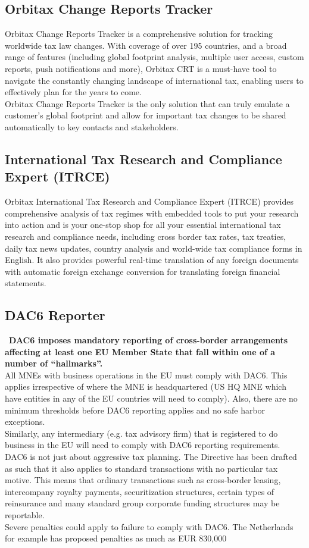 \begin{flushleft}
\subsection{Orbitax Change Reports Tracker}
Orbitax Change Reports Tracker is a comprehensive solution for tracking worldwide tax law changes. With coverage of over 195 countries, and a broad range of features (including global footprint analysis, multiple user access, custom reports, push notifications and more), Orbitax CRT is a must-have tool to navigate the constantly changing landscape of international tax, enabling users to effectively plan for the years to come.\\

Orbitax Change Reports Tracker is the only solution that can truly emulate a customer’s global footprint and allow for important tax changes to be shared automatically to key contacts and stakeholders.

\subsection{International Tax Research and Compliance Expert (ITRCE)}
Orbitax International Tax Research and Compliance Expert (ITRCE) provides comprehensive analysis of tax regimes with embedded tools to put your research into action and is your one-stop shop for all your essential international tax research and compliance needs, including cross border tax rates, tax treaties, daily tax news updates, country analysis and world-wide tax compliance forms in English. It also provides powerful real-time translation of any foreign documents with automatic foreign exchange conversion for translating foreign financial statements.

\subsection{DAC6 Reporter}\
\textbf{DAC6 imposes mandatory reporting of cross-border arrangements affecting at least one EU Member State that fall within one of a number of “hallmarks”.}\\
All MNEs with business operations in the EU must comply with DAC6. This applies irrespective of where the MNE is headquartered (US HQ MNE which have entities in any of the EU countries will need to comply). Also, there are no minimum thresholds before DAC6 reporting applies and no safe harbor exceptions.\\
Similarly, any intermediary (e.g. tax advisory firm) that is registered to do business in the EU will need to comply with DAC6 reporting requirements.\\
DAC6 is not just about aggressive tax planning. The Directive has been drafted as such that it also applies to standard transactions with no particular tax motive. This means that ordinary transactions such as cross-border leasing, intercompany royalty payments, securitization structures, certain types of reinsurance and many standard group corporate funding structures may be reportable. \\
Severe penalties could apply to failure to comply with DAC6. The Netherlands for example has proposed penalties as much as EUR 830,000


\end{flushleft}
